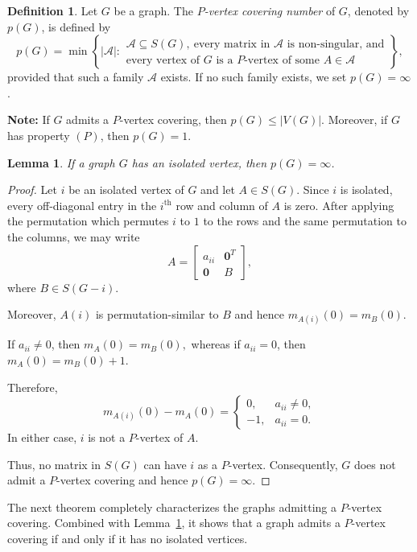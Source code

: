 \documentclass[12pt,reqno]{amsart}
\theoremstyle{plain}
\newtheorem{lem}{Lemma}
\theoremstyle{definition}
\newtheorem{defn}{Definition}
\theoremstyle{block}
\theoremstyle{remark}
\numberwithin{equation}{section}
\begin{document}
\begin{defn}
Let \(G\) be a graph. The \emph{\(P\)-vertex covering number} of \(G\),
denoted by \(p(G)\), is defined by
\[
p(G)
=
\min\left\{
|\mathcal{A}|:
\begin{array}{l}
\mathcal{A}\subseteq S(G),\ \text{every matrix in }\mathcal{A}
\text{ is non-singular, and}\\[2mm]
\text{every vertex of }G\text{ is a \(P\)-vertex of some }
A\in\mathcal{A}
\end{array}
\right\},
\]
provided that such a family \(\mathcal{A}\) exists. If no such family
exists, we set \(p(G)=\infty\).
\end{defn}

\textbf{Note:}
If \(G\) admits a \(P\)-vertex covering, then
\(
p(G)\leq |V(G)|.
\)
Moreover, if \(G\) has property \((P)\), then \(p(G)=1\).


\begin{lem}\label{isolated}
If a graph \(G\) has an isolated vertex, then \(p(G)=\infty\).
\end{lem}

\begin{proof}
Let \(i\) be an isolated vertex of \(G\) and let \(A\in S(G)\). Since
\(i\) is isolated, every off-diagonal entry in the \(i^\text{th}\) row and
column of \(A\) is zero. After applying the permutation which permutes $i$ to $1$ to the
rows and the same permutation to the columns, we may write
\[
A=
\begin{bmatrix}
a_{ii} & \mathbf{0}^{T}\\
\mathbf{0} & B
\end{bmatrix},
\]
where \(B\in S(G-i)\). 

Moreover, \(A(i)\) is permutation-similar to
\(B\) and hence
\(
m_{A(i)}(0)=m_B(0).
\)

If \(a_{ii}\neq 0\), then
\(
m_A(0)=m_B(0),
\) whereas if \(a_{ii}=0\), then
\(
m_A(0)=m_B(0)+1.
\)

Therefore,
\[
m_{A(i)}(0)-m_A(0)
=
\begin{cases}
0, & a_{ii}\neq 0,\\
-1, & a_{ii}=0.
\end{cases}
\]
In either case, \(i\) is not a \(P\)-vertex of \(A\).

Thus, no matrix in \(S(G)\) can have \(i\) as a \(P\)-vertex.
Consequently, \(G\) does not admit a \(P\)-vertex covering and hence
\(
p(G)=\infty.
\)


\end{proof}
The next theorem completely characterizes the graphs admitting a \(P\)-vertex covering. Combined with Lemma~\ref{isolated}, it shows that a graph admits a $P$-vertex covering if and only if it has no isolated vertices.
\end{document}
